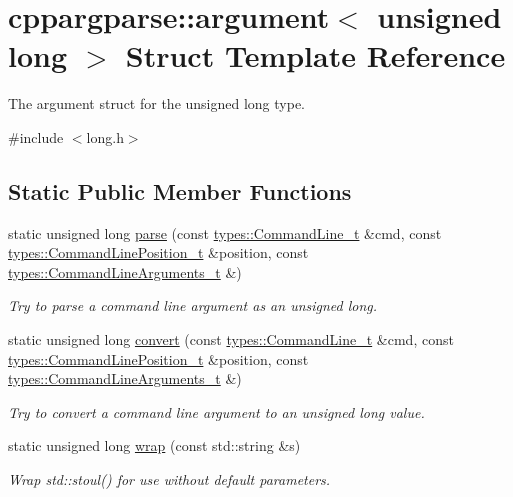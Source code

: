 \hypertarget{structcppargparse_1_1argument_3_01unsigned_01long_01_4}{}\section{cppargparse\+:\+:argument$<$ unsigned long $>$ Struct Template Reference}
\label{structcppargparse_1_1argument_3_01unsigned_01long_01_4}


The argument struct for the unsigned long type.  




{\ttfamily \#include $<$long.\+h$>$}

\subsection*{Static Public Member Functions}
\begin{DoxyCompactItemize}
\item 
static unsigned long \hyperlink{structcppargparse_1_1argument_3_01unsigned_01long_01_4_aa43a6629fb21aa0527c3fadcede3a166}{parse} (const \hyperlink{types_8h_a80adf2418b7ce9fe616698efa7533ecf}{types\+::\+Command\+Line\+\_\+t} \&cmd, const \hyperlink{types_8h_a43b4f43f8940de1bf09ced6f1b668053}{types\+::\+Command\+Line\+Position\+\_\+t} \&position, const \hyperlink{types_8h_a003c660afe2ee9c6cc39aea966e8926d}{types\+::\+Command\+Line\+Arguments\+\_\+t} \&)
\begin{DoxyCompactList}\small\item\em Try to parse a command line argument as an unsigned long. \end{DoxyCompactList}\item 
static unsigned long \hyperlink{structcppargparse_1_1argument_3_01unsigned_01long_01_4_a3beb14e05f31f1afc474a0288d16f9e7}{convert} (const \hyperlink{types_8h_a80adf2418b7ce9fe616698efa7533ecf}{types\+::\+Command\+Line\+\_\+t} \&cmd, const \hyperlink{types_8h_a43b4f43f8940de1bf09ced6f1b668053}{types\+::\+Command\+Line\+Position\+\_\+t} \&position, const \hyperlink{types_8h_a003c660afe2ee9c6cc39aea966e8926d}{types\+::\+Command\+Line\+Arguments\+\_\+t} \&)
\begin{DoxyCompactList}\small\item\em Try to convert a command line argument to an unsigned long value. \end{DoxyCompactList}\item 
static unsigned long \hyperlink{structcppargparse_1_1argument_3_01unsigned_01long_01_4_a683be63bc3df22e2cf193ebdaed10b2d}{wrap} (const std\+::string \&s)
\begin{DoxyCompactList}\small\item\em Wrap std\+::stoul() for use without default parameters. \end{DoxyCompactList}\end{DoxyCompactItemize}


